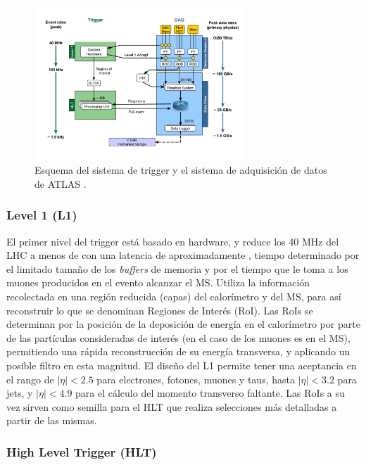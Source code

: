 \begin{figure}
  \centering
  \includegraphics[width=0.7\textwidth]{images/lhc/tdaqFullNew2017.pdf}
  \caption{Esquema del sistema de trigger y el sistema de adquisición de datos de ATLAS \cite{tdaq_plot}.}
  \label{tdaq}
\end{figure}

\subsubsection{Level 1 (L1)}

El primer nivel del trigger \cite{level1} está basado en hardware, y reduce los 40 MHz del LHC a menos de  con una latencia de aproximadamente , tiempo determinado por el limitado tamaño de los \textit{buffers} de memoria y por el tiempo que le toma a los muones producidos en el evento alcanzar el MS. Utiliza la información recolectada en una región reducida (capas) del calorímetro y del MS, para así reconstruir lo que se denominan Regiones de Interés (RoI). Las RoIs se determinan por la posición de la deposición de energía en el calorímetro por parte de las partículas consideradas de interés (en el caso de los muones es en el MS), permitiendo una rápida reconstrucción de su energía transversa, y aplicando un posible filtro en esta magnitud. El diseño del L1 permite tener una aceptancia en el rango de $|\eta|<2.5$ para electrones, fotones, muones y taus, hasta $|\eta|<3.2$ para jets, y $|\eta|<4.9$ para el cálculo del momento transverso faltante. Las RoIs a su vez sirven como semilla para el HLT que realiza selecciones más detalladas a partir de las mismas.

\subsubsection{High Level Trigger (HLT)}

